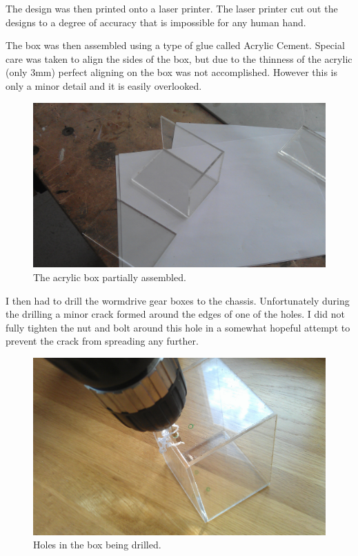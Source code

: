 \documentclass[]{report}   %
\begin{document}
				The design was then printed onto a laser printer. The laser printer cut out the designs to a degree of accuracy that is impossible for any							human hand.		
						
				The box was then assembled using a type of glue called Acrylic Cement. Special care was taken to align the sides of the box, but due to the thinness
				of the acrylic (only 3mm) perfect aligning on the box was not accomplished. However this is only a minor detail and it is easily overlooked.
						
						\begin{figure}[h]
							\caption{The acrylic box partially assembled.}
							\includegraphics[width=\textwidth,height=\textheight,keepaspectratio]{images/almostdone}
						\end{figure}
						
						I then had to drill the wormdrive gear boxes to the chassis. Unfortunately during the drilling a minor crack formed around the edges of one of the holes.
						I did not fully tighten the nut and bolt around this hole in a somewhat hopeful attempt to prevent the crack from spreading any further.
						
						\begin{figure}[h]
							\caption{Holes in the box being drilled.}
							\includegraphics[width=\textwidth,height=\textheight,keepaspectratio]{images/drilldrilldrill}
						\end{figure}
						
\end{document}

